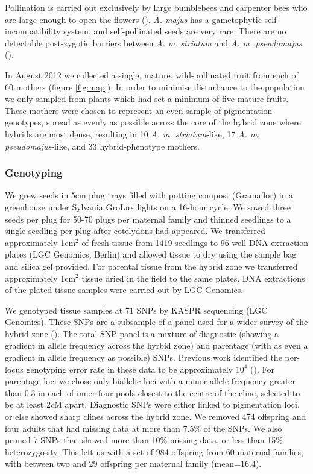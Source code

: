\documentclass[10pt, a4paper, twocolumn]{article} %
\begin{document}
Pollination is carried out exclusively by large bumblebees and carpenter bees who are large enough to open the flowers (\cite{vargas2010occluded, andalo2019prevalence}). \textit{A. majus} has a gametophytic self-incompatibility system, and self-pollinated seeds are very rare. There are no detectable post-zygotic barriers between \textit{A. m. striatum} and \textit{A. m. pseudomajus} (\cite{andalo2010post}).

In August 2012 we collected a single, mature, wild-pollinated fruit from each of 60 mothers (figure \ref{fig:map}). In order to minimise disturbance to the population we only sampled from plants which had set a minimum of five mature fruits. These mothers were chosen to represent an even sample of pigmentation genotypes, spread as evenly as possible across the core of the hybrid zone where hybrids are most dense, resulting in 10 \textit{A. m. striatum}-like, 17 \textit{A. m. pseudomajus}-like, and 33 hybrid-phenotype mothers.

\subsubsection{Genotyping}

We grew seeds in 5cm plug trays filled with potting compost (Gramaflor) in a greenhouse under Sylvania GroLux lights on a 16-hour cycle. We sowed three seeds per plug for 50-70 plugs per maternal family and thinned seedlings to a single seedling per plug after cotelydons had appeared. We transferred approximately 1cm$^2$ of fresh tissue from 1419 seedlings to 96-well DNA-extraction plates (LGC Genomics, Berlin) and allowed tissue to dry using the sample bag and silica gel provided. For parental tissue from the hybrid zone we transferred approximately 1cm$^2$ tissue dried in the field to the same plates. DNA extractions of the plated tissue samples were carried out by LGC Genomics.

We genotyped tissue samples at 71 SNPs by KASPR sequencing (LGC Genomics). These SNPs are a subsample of a panel used for a wider survey of the hybrid zone (\cite{surendranadh2022effects}). The total SNP panel is a mixture of  diagnostic (showing a gradient in allele frequency across the hyrbid zone) and parentage (with as even a gradient in allele frequency as possible) SNPs. Previous work identified the per-locus genotyping error rate in these data to be approximately $10^4$ (\cite{surendranadh2022effects}). For parentage loci we chose only biallelic loci with a minor-allele frequency greater than 0.3 in each of inner four pools closest to the centre of the cline, selected to be at least 2cM apart. Diagnostic SNPs were either linked to pigmentation loci, or else showed sharp clines across the hybrid zone. We removed 474 offspring and four adults that had missing data at more than 7.5\% of the SNPs. We also pruned 7 SNPs that showed more than 10\% missing data, or less than 15\% heterozygosity. This left us with a set of 984 offspring from 60 maternal families, with between two and 29 offspring per maternal family (mean=16.4).
\end{document}
